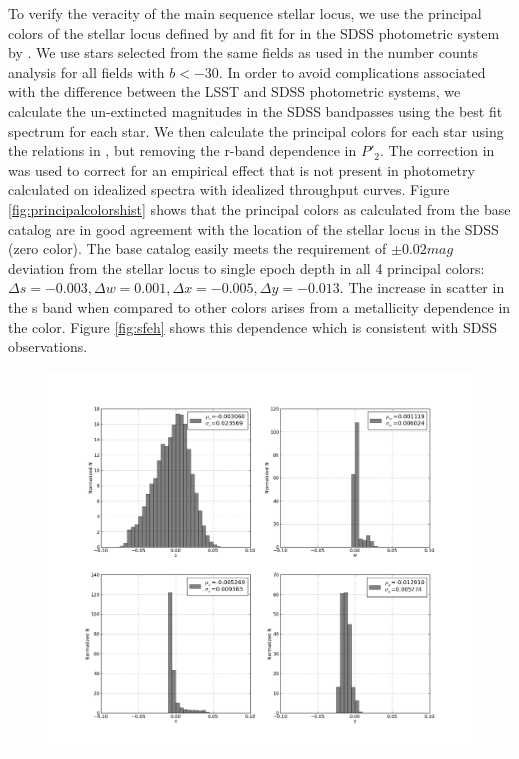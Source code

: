 \documentclass[]{article}
\begin{document}
{To verify the veracity of the main sequence stellar locus, we use the principal colors of the stellar locus defined by \citet{helmi02} and 
fit for in the SDSS photometric system by \citet{ivezic04}.
We use stars selected from the same fields as used in the number counts analysis for all fields with $b<-30$.
In order to avoid complications associated with the difference between the LSST and SDSS photometric systems, we calculate the un-extincted 
magnitudes in the SDSS bandpasses using the best fit spectrum for each star.  We then calculate
the principal colors for each star using the relations in \citet{ivezic04}, but removing the r-band dependence in $P\prime_{2}$.  The correction
in \citet{ivezic04} was used to correct for an empirical effect that is not present in photometry calculated on idealized spectra with idealized throughput
curves. Figure
\ref{fig:principalcolorshist} shows that the principal colors as calculated from the base catalog are in good agreement with
the location of the stellar locus in the SDSS (zero color).  The base catalog easily meets the requirement of $\pm0.02mag$ deviation
from the stellar locus to single epoch depth in all 4 principal colors: ${\Delta}s=-0.003, {\Delta}w=0.001, {\Delta}x=-0.005, {\Delta}y=-0.013$.  
The increase in scatter in the s band when compared to other colors arises from a metallicity dependence in the color.  Figure \ref{fig:sfeh} shows this 
dependence which is consistent with SDSS observations.
\begin{figure}[H]
\centering
\includegraphics[width=5in]{validation_figures/principal_colors_hist.png}

\end{figure}}
\end{document}
